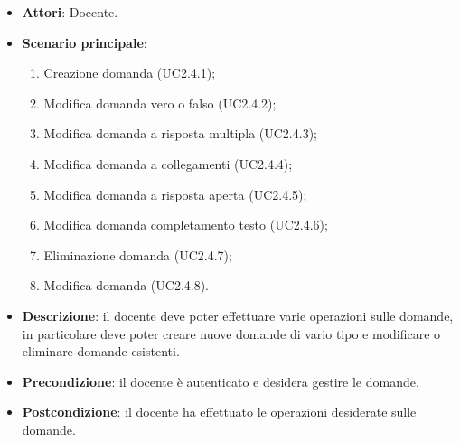 \begin{itemize}
\item \textbf{Attori}: Docente.
\item \textbf{Scenario principale}:
\begin{enumerate}
\item Creazione domanda (UC2.4.1);
\item Modifica domanda vero o falso (UC2.4.2);
\item Modifica domanda a risposta multipla (UC2.4.3);
\item Modifica domanda a collegamenti (UC2.4.4);
\item Modifica domanda a risposta aperta (UC2.4.5);
\item Modifica domanda completamento testo (UC2.4.6);
\item Eliminazione domanda (UC2.4.7);
\item Modifica domanda (UC2.4.8).
\end{enumerate}
\item \textbf{Descrizione}: il docente deve poter effettuare varie operazioni sulle domande, in particolare deve poter creare nuove domande di vario tipo e modificare o eliminare domande esistenti.
\item \textbf{Precondizione}: il docente è autenticato e desidera gestire le domande.
\item \textbf{Postcondizione}: il docente ha effettuato le operazioni desiderate sulle domande.
\end{itemize}
